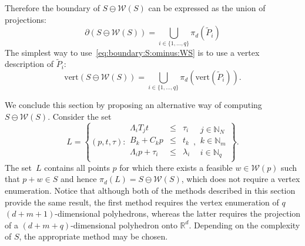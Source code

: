 \documentclass[smallextended]{svjour3}       %
\numberwithin{equation}{section}
\begin{document}
%
%
Therefore the boundary of $S\ominus \mathcal W(S)$ can be expressed as the union of projections:
%
\begin{equation}\label{eq:boundary:S:ominus:WS}
 \partial(S\ominus\mathcal W(S)) = \bigcup_{i\in\{1,\dots,q\}}\pi_d\left(
\tilde P_i
 \right)
\end{equation}
%
The simplest way to use~\eqref{eq:boundary:S:ominus:WS} is to use a vertex description of $\tilde P_i$:
%
\begin{equation}\label{the:way:we:compute:p:pontryagin:differences}
  \text{vert}(S\ominus\mathcal W(S)) =
  \bigcup_{i\in\{1,\dots,q\}}\pi_d(\text{vert}(\tilde P_i)) .
\end{equation}

We conclude this section by proposing an alternative way of computing $S\ominus\mathcal W(S)$.
%
%
Consider the set
%
\begin{equation}
  L = \left\{(p,t,\tau):\begin{array}{rcl}
  \Lambda_iT_jt&\leq&\tau_i\\
  B_k+C_k p&\leq& t_k\\
  \Lambda_i p + \tau_i&\leq&\lambda_i\\
  \end{array},\begin{array}{l}
  j\in\mathbb N_N\\
  k\in\mathbb N_m\\
  i\in\mathbb N_q\end{array}
  \right\} .
\end{equation}
%
The set~$L$ contains all points $p$ for which there exists a feasible $w\in\mathcal W(p)$ such that $p+w\in S$ and hence $\pi_d(L)=S\ominus\mathcal W(S)$, which does not require a vertex enumeration.
%
Notice that although both of the methods described in this section
provide the same result, the first method requires the vertex
enumeration of $q$ $(d + m + 1)$-dimensional polyhedrons, whereas the
latter requires the projection of a $(d + m + q)$-dimensional polyhedron
onto $\mathbb R^d$. Depending on the complexity of $S$, the appropriate method may be chosen.
%
%
%
%
\end{document}
